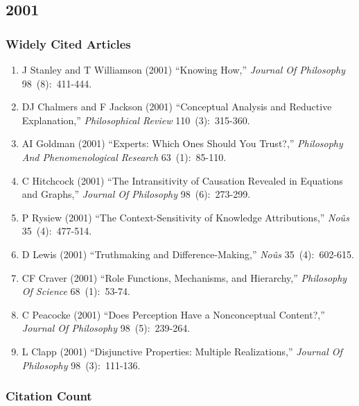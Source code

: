 \documentclass[
  10pt,
  letterpaper,
  DIV=11,
  numbers=noendperiod,
  twoside]{scrartcl}
\providecommand{\tightlist}{%
  \setlength{\itemsep}{0pt}\setlength{\parskip}{0pt}}\usepackage{longtable,booktabs,array}
\begin{document}
\newpage

\subsection{2001}\label{sec-s2001}

\subsubsection*{Widely Cited Articles}\label{widely-cited-articles-45}

\begin{enumerate}
\def\labelenumi{\arabic{enumi}.}
\tightlist
\item
  J Stanley and T Williamson (2001) ``Knowing How,'' \emph{Journal Of
  Philosophy} 98~(8):~411-444.
\item
  DJ Chalmers and F Jackson (2001) ``Conceptual Analysis and Reductive
  Explanation,'' \emph{Philosophical Review} 110~(3):~315-360.
\item
  AI Goldman (2001) ``Experts: Which Ones Should You Trust?,''
  \emph{Philosophy And Phenomenological Research} 63~(1):~85-110.
\item
  C Hitchcock (2001) ``The Intransitivity of Causation Revealed in
  Equations and Graphs,'' \emph{Journal Of Philosophy} 98~(6):~273-299.
\item
  P Rysiew (2001) ``The Context-Sensitivity of Knowledge Attributions,''
  \emph{Noûs} 35~(4):~477-514.
\item
  D Lewis (2001) ``Truthmaking and Difference-Making,'' \emph{Noûs}
  35~(4):~602-615.
\item
  CF Craver (2001) ``Role Functions, Mechanisms, and Hierarchy,''
  \emph{Philosophy Of Science} 68~(1):~53-74.
\item
  C Peacocke (2001) ``Does Perception Have a Nonconceptual Content?,''
  \emph{Journal Of Philosophy} 98~(5):~239-264.
\item
  L Clapp (2001) ``Disjunctive Properties: Multiple Realizations,''
  \emph{Journal Of Philosophy} 98~(3):~111-136.
\end{enumerate}

\subsubsection*{Citation Count}\label{sec-count-2001}
\end{document}
